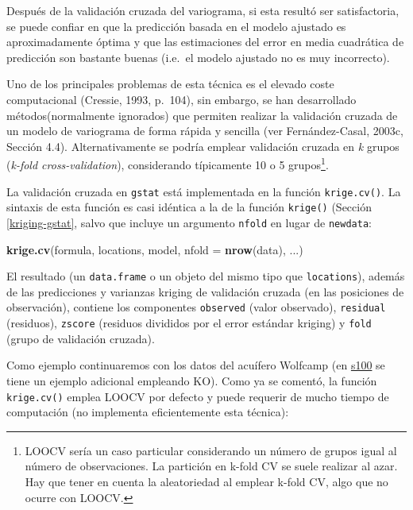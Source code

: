 \documentclass[
]{book}
\newenvironment{Shaded}{\begin{snugshade}}{\end{snugshade}}
\newcommand{\AttributeTok}[1]{\textcolor[rgb]{0.13,0.29,0.53}{#1}}
\newcommand{\FunctionTok}[1]{\textcolor[rgb]{0.13,0.29,0.53}{\textbf{#1}}}
\newcommand{\NormalTok}[1]{#1}
\theoremstyle{break}
\theoremstyle{definition}
\theoremstyle{definition}
\theoremstyle{definition}
\theoremstyle{definition}
\theoremstyle{remark}
\begin{document}
Después de la validación cruzada del variograma, si esta resultó ser satisfactoria, se puede confiar en que la predicción basada en el modelo ajustado es aproximadamente óptima y que las estimaciones del error en media cuadrática de predicción son bastante buenas (i.e.~el modelo ajustado no es muy incorrecto).

Uno de los principales problemas de esta técnica es el elevado coste computacional (Cressie, 1993, p.~104), sin embargo, se han desarrollado métodos(normalmente ignorados) que permiten realizar la validación cruzada de un modelo de variograma de forma rápida y sencilla (ver Fernández-Casal, 2003c, Sección 4.4).
Alternativamente se podría emplear validación cruzada en \emph{k} grupos (\emph{k-fold cross-validation}), considerando típicamente 10 o 5 grupos\footnote{LOOCV sería un caso particular considerando un número de grupos igual al número de observaciones. La partición en k-fold CV se suele realizar al azar. Hay que tener en cuenta la aleatoriedad al emplear k-fold CV, algo que no ocurre con LOOCV.}.

La validación cruzada en \texttt{gstat} está implementada en la función \texttt{krige.cv()}.
La sintaxis de esta función es casi idéntica a la de la función \texttt{krige()} (Sección \ref{kriging-gstat}, salvo que incluye un argumento \texttt{nfold} en lugar de \texttt{newdata}:

\begin{Shaded}
\begin{Highlighting}[]
\FunctionTok{krige.cv}\NormalTok{(formula, locations, model, }\AttributeTok{nfold =} \FunctionTok{nrow}\NormalTok{(data), ...)}
\end{Highlighting}
\end{Shaded}

El resultado (un \texttt{data.frame} o un objeto del mismo tipo que \texttt{locations}), además de las predicciones y varianzas kriging de validación cruzada (en las posiciones de observación), contiene los componentes \texttt{observed} (valor observado), \texttt{residual} (residuos), \texttt{zscore} (residuos divididos por el error estándar kriging) y \texttt{fold} (grupo de validación cruzada).

Como ejemplo continuaremos con los datos del acuífero Wolfcamp (en \href{s100.html}{s100} se tiene un ejemplo adicional empleando KO).
Como ya se comentó, la función \texttt{krige.cv()} emplea LOOCV por defecto y puede requerir de mucho tiempo de computación (no implementa eficientemente esta técnica):
\end{document}
